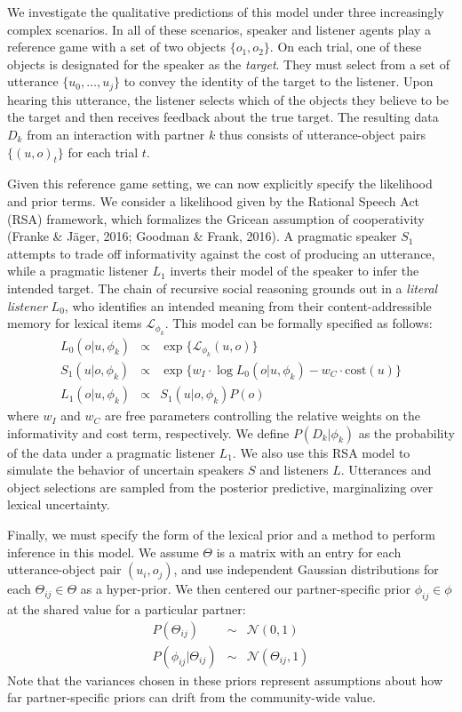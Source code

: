 \documentclass[10pt, letterpaper]{article}
\begin{document}
We investigate the qualitative predictions of this model under three
increasingly complex scenarios. In all of these scenarios, speaker and
listener agents play a reference game with a set of two objects
\(\{o_1, o_2\}\). On each trial, one of these objects is designated for
the speaker as the \emph{target}. They must select from a set of
utterance \(\{u_0, \dots, u_j\}\) to convey the identity of the target
to the listener. Upon hearing this utterance, the listener selects which
of the objects they believe to be the target and then receives feedback
about the true target. The resulting data \(D_k\) from an interaction
with partner \(k\) thus consists of utterance-object pairs
\(\{(u, o)_t\}\) for each trial \(t\).

Given this reference game setting, we can now explicitly specify the
likelihood and prior terms. We consider a likelihood given by the
Rational Speech Act (RSA) framework, which formalizes the Gricean
assumption of cooperativity (Franke \& Jäger, 2016; Goodman \& Frank,
2016). A pragmatic speaker \(S_1\) attempts to trade off informativity
against the cost of producing an utterance, while a pragmatic listener
\(L_1\) inverts their model of the speaker to infer the intended target.
The chain of recursive social reasoning grounds out in a
\emph{literal listener} \(L_0\), who identifies an intended meaning from
their content-addressible memory for lexical items
\(\mathcal{L}_{\phi_k}\). This model can be formally specified as
follows: \[
\begin{array}{rcl}
L_0(o | u, \phi_k) &\propto  & \exp\{\mathcal{L}_{\phi_k}(u,o)\} \\
S_1(u | o, \phi_k) &\propto &  \exp\{w_I \cdot \log L_0(o | u, \phi_k) - w_C \cdot \textrm{cost}(u)\}   \\
L_1(o | u, \phi_k) &\propto  & S_1(u | o, \phi_k) P(o) 
\end{array}
\] where \(w_I\) and \(w_C\) are free parameters controlling the
relative weights on the informativity and cost term, respectively. We
define \(P(D_k | \phi_k)\) as the probability of the data under a
pragmatic listener \(L_1\). We also use this RSA model to simulate the
behavior of uncertain speakers \(S\) and listeners \(L\). Utterances and
object selections are sampled from the posterior predictive,
marginalizing over lexical uncertainty.

Finally, we must specify the form of the lexical prior and a method to
perform inference in this model. We assume \(\Theta\) is a matrix with
an entry for each utterance-object pair \((u_i, o_j)\), and use
independent Gaussian distributions for each \(\Theta_{ij} \in \Theta\)
as a hyper-prior. We then centered our partner-specific prior
\(\phi_{ij} \in \phi\) at the shared value for a particular partner:
\[\begin{array}{rcl}
P(\Theta_{ij}) & \sim & \mathcal{N}(0, 1)\\
P(\phi_{ij} | \Theta_{ij}) & \sim & \mathcal{N}(\Theta_{ij}, 1)
\end{array}\] Note that the variances chosen in these priors represent
assumptions about how far partner-specific priors can drift from the
community-wide value.
\end{document}
